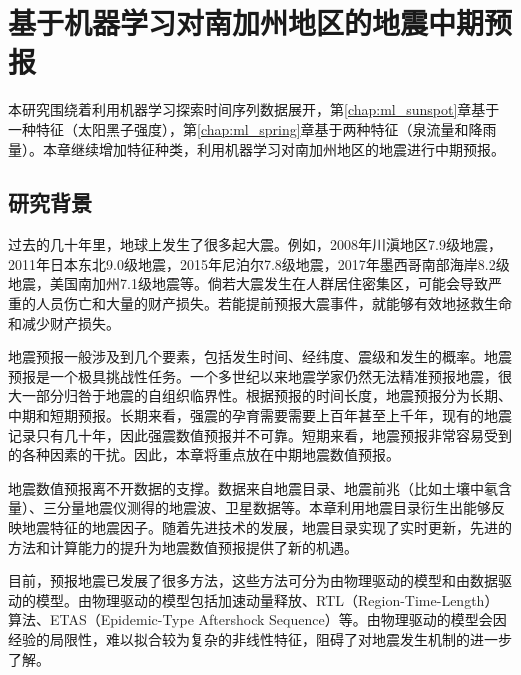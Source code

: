 \chapter{基于机器学习对南加州地区的地震中期预报}\label{chap:ml_seismic}

本研究围绕着利用机器学习探索时间序列数据展开，第\ref{chap:ml_sunspot}章基于一种特征（太阳黑子强度），第\ref{chap:ml_spring}章基于两种特征（泉流量和降雨量）。本章继续增加特征种类，利用机器学习对南加州地区的地震进行中期预报。

\section{研究背景}\label{sec:seism_introduction}

过去的几十年里，地球上发生了很多起大震。例如，2008年川滇地区7.9级地震，2011年日本东北9.0级地震，2015年尼泊尔7.8级地震，2017年墨西哥南部海岸8.2级地震，美国南加州7.1级地震等。倘若大震发生在人群居住密集区，可能会导致严重的人员伤亡和大量的财产损失。若能提前预报大震事件，就能够有效地拯救生命和减少财产损失。

地震预报一般涉及到几个要素，包括发生时间、经纬度、震级和发生的概率\citep{allen1976responsibilities}。地震预报是一个极具挑战性任务\citep{geller1997earthquakes}。一个多世纪以来地震学家仍然无法精准预报地震，很大一部分归咎于地震的自组织临界性。根据预报的时间长度，地震预报分为长期、中期和短期预报\citep{Pulinets2018What}。长期来看，强震的孕育需要需要上百年甚至上千年，现有的地震记录只有几十年，因此强震数值预报并不可靠。短期来看，地震预报非常容易受到的各种因素的干扰。因此，本章将重点放在中期地震数值预报。

地震数值预报离不开数据的支撑。数据来自地震目录、地震前兆（比如土壤中氡含量）、三分量地震仪测得的地震波、卫星数据等\citep{al2020application}。本章利用地震目录衍生出能够反映地震特征的地震因子。随着先进技术的发展，地震目录实现了实时更新，先进的方法和计算能力的提升为地震数值预报提供了新的机遇。

目前，预报地震已发展了很多方法，这些方法可分为由物理驱动的模型和由数据驱动的模型。由物理驱动的模型包括加速动量释放\citep{Ben2002Accelerated}、RTL（Region-Time-Length）算法\citep{Sobolev2007On}、ETAS（Epidemic-Type Aftershock Sequence）\citep{Ogata1986Statistical}等。由物理驱动的模型会因经验的局限性，难以拟合较为复杂的非线性特征，阻碍了对地震发生机制的进一步了解。

